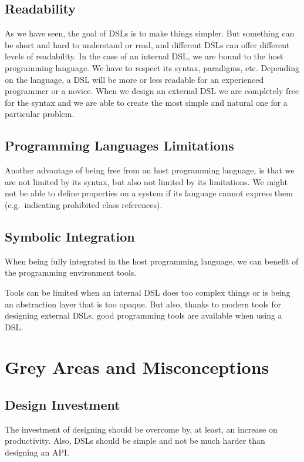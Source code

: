 \documentclass{proc}
\begin{document}
\subsection{Readability}
As we have seen, the goal of DSLs is to make things simpler. But something can
be short and hard to understand or read, and different DSLs can offer different
levels of readability. In the case of an internal DSL, we are bound to the host
programming language. We have to respect its syntax, paradigms, etc. Depending
on the language, a DSL will be more or less readable for an experienced
programmer or a novice. When we design an external DSL we are completely free
for the syntax and we are able to create the most simple and natural one for a
particular problem.

\subsection{Programming Languages Limitations}
Another advantage of being free from an host programming language, is that we
are not limited by its syntax, but also not limited by its limitations. We might
not be able to define properties on a system if its language cannot express them
(e.g.\ indicating prohibited class references).

\subsection{Symbolic Integration}
When being fully integrated in the host programming language, we can benefit of
the programming environment tools.

Tools can be limited when an internal DSL does too complex things or is being an
abstraction layer that is too opaque. But also, thanks to modern tools for
designing external DSLs, good programming tools are available when using a DSL\@.



\section{Grey Areas and Misconceptions}
\label{grey}

\subsection{Design Investment}
The investment of designing should be overcome by, at least, an increase on
productivity. Also, DSLs should be simple and not be much harder than designing
an API\@.
\end{document}
